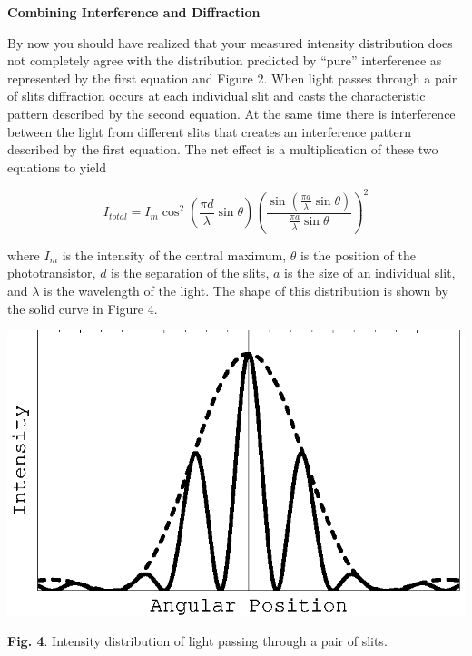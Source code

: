 \textbf{Combining Interference and Diffraction}

By now you should have realized that your measured intensity distribution
does not completely agree with the distribution predicted by {}``pure''
interference as represented by the first equation and Figure 2. When
light passes through a pair of slits diffraction occurs at each individual
slit and casts the characteristic pattern described by the second
equation. At the same time there is interference between the light
from different slits that creates an interference pattern described
by the first equation. The net effect is a multiplication of these
two equations to yield 

\begin{displaymath} I_{total} = I_m \cos^2 (\frac {\pi d} {\lambda} \sin \theta ) (\frac {\sin (\frac {\pi a} {\lambda} \sin \theta)} {\frac {\pi a} {\lambda} \sin \theta} )^2 \end{displaymath}

where $I_{m}$ is the intensity of the central maximum, \( \theta  \)
is the position of the phototransistor, $d$ is the separation of the
slits, $a$ is the size of an individual slit, and \( \lambda  \) is
the wavelength of the light. The shape of this distribution is shown
by the solid curve in Figure 4.

\vspace{0.3cm}
{\centering \includegraphics{diffraction_of_light/diffraction_of_light_fig_4.eps} \par}
\vspace{0.3cm}

{\centering \textbf{Fig. 4}. Intensity distribution of light passing
through a pair of slits.\par}

